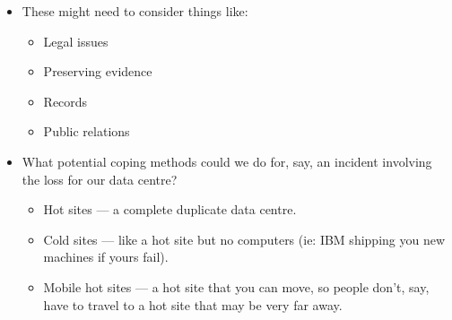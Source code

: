 \documentclass{article}
\begin{document}
\begin{itemize}
    \item These might need to consider things like:
        \begin{itemize}
            \item Legal issues
            \item Preserving evidence
            \item Records
            \item Public relations
        \end{itemize}
    \item What potential coping methods could we do for, say, an incident involving the loss for our data centre?
        \begin{itemize}
            \item Hot sites --- a complete duplicate data centre.
            \item Cold sites --- like a hot site but no computers (ie: IBM shipping you new machines if yours fail).
            \item Mobile hot sites --- a hot site that you can move, so people don't, say, have to travel to a hot site that may be very far away.
        \end{itemize}
\end{itemize}
\end{document}
